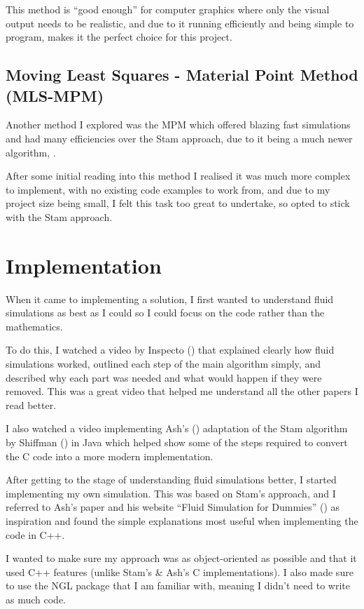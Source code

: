 \documentclass[notitlepage,12pt]{article}
\begin{document}
This method is ``good enough'' for computer graphics where only the visual output needs to be realistic, and due to it running efficiently and being simple to program, makes it the perfect choice for this project.

\subsection{Moving Least Squares - Material Point Method (MLS-MPM)}

Another method I explored was the MPM which offered blazing fast simulations and had many efficiencies over the Stam approach, due to it being a much newer algorithm, \cite{mlsmpm}.

After some initial reading into this method I realised it was much more complex to implement, with no existing code examples to work from, and due to my project size being small, I felt this task too great to undertake, so opted to stick with the Stam approach.

\section{Implementation}

When it came to implementing a solution, I first wanted to understand fluid simulations as best as I could so I could focus on the code rather than the mathematics. 

To do this, I watched a video by Inspecto (\cite{inspectoyt}) that explained clearly how fluid simulations worked, outlined each step of the main algorithm simply, and described why each part was needed and what would happen if they were removed. This was a great video that helped me understand all the other papers I read better.

I also watched a video implementing Ash's (\cite{ash2005simulation}) adaptation of the Stam algorithm by Shiffman (\cite{shiffmanyt}) in Java which helped show some of the steps required to convert the C code into a more modern implementation.

After getting to the stage of understanding fluid simulations better, I started implementing my own simulation. This was based on Stam's approach, and I referred to Ash's paper and his website ``Fluid Simulation for Dummies'' (\cite{ashdummies}) as inspiration and found the simple explanations most useful when implementing the code in C++.

I wanted to make sure my approach was as object-oriented as possible and that it used C++ features (unlike Stam's \& Ash's C implementations). I also made sure to use the NGL package that I am familiar with, meaning I didn't need to write as much code. 
\end{document}
